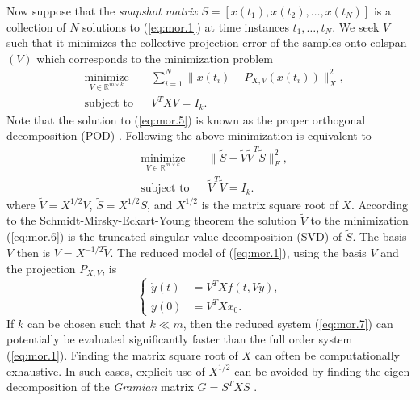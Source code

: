 Now suppose that the \emph{snapshot matrix} $S=[x(t_1),x(t_2),\ldots,x(t_N)]$ is a collection of $N$ solutions to (\ref{eq:mor.1}) at time instances $t_1,\dots,t_N$. We seek $V$ such that it minimizes the collective projection error of the samples onto colspan$(V)$ which corresponds to the minimization problem
\begin{equation} \label{eq:mor.5}
\begin{aligned}
& \underset{V\in \mathbb{R}^{m\times k}}{\text{minimize}}
& & \sum_{i=1}^N \| x(t_i) - P_{X,V}( x(t_i) ) \|_X^2, \\
& \text{subject to}
& & V^TXV = I_k.
\end{aligned}
\end{equation}
Note that the solution to (\ref{eq:mor.5}) is known as the proper orthogonal decomposition (POD) \cite{hesthaven2015certified,quarteroni2015reduced,gubisch2017proper}. Following \cite{quarteroni2015reduced} the above minimization is equivalent to
\begin{equation} \label{eq:mor.6}
\begin{aligned}
& \underset{V\in \mathbb{R}^{m\times k}}{\text{minimize}}
& & \| \tilde S - \tilde V \tilde V^T \tilde S \|_F^2, \\
& \text{subject to}
& & \tilde V^T\tilde V = I_k.
\end{aligned}
\end{equation} 
where $\tilde V = X^{1/2} V$, $\tilde S = X^{1/2} S$, and $X^{1/2}$ is the matrix square root of $X$. According to the Schmidt-Mirsky-Eckart-Young theorem \cite{Markovsky:2011:LRA:2103589} the solution $\tilde V$ to the minimization (\ref{eq:mor.6}) is the truncated singular value decomposition (SVD) of $\tilde S$. The basis $V$ then is $V = X^{-1/2}\tilde V$. The reduced model of (\ref{eq:mor.1}), using the basis $V$ and the projection $P_{X,V}$, is
\begin{equation} \label{eq:mor.7}
	\left\{
	\begin{aligned}
	\dot y(t) &= V^TX f(t,Vy), \\
	y(0) &= V^TX x_0.
	\end{aligned}
	\right.
\end{equation}
If $k$ can be chosen such that $k \ll m$, then the reduced system (\ref{eq:mor.7}) can potentially be evaluated significantly faster than the full order system (\ref{eq:mor.1}). Finding the matrix square root of $X$ can often be computationally exhaustive. In such cases, explicit use of $X^{1/2}$ can be avoided by finding the eigen-decomposition of the \emph{Gramian} matrix $G = S^TXS$ \cite{quarteroni2015reduced,Haasdonk2017}.

